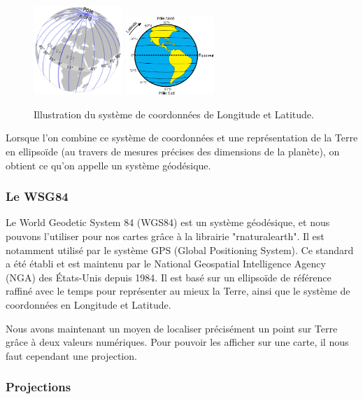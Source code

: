 \documentclass{article}
\begin{document}
\begin{figure}[htp]
    \centering
    \includegraphics[width=0.3\textwidth]{Images/Cartographie/Longitude.png}
    \includegraphics[width=0.3\textwidth]{Images/Cartographie/Latitude.png}
    \caption{Illustration du système de coordonnées de Longitude et Latitude.}
    \label{fig:longitude_et_latitude}
\end{figure}

Lorsque l'on combine ce système de coordonnées et une représentation de la Terre en ellipsoïde (au travers de mesures précises des dimensions de la planète), on obtient ce qu'on appelle un système géodésique.

\subsubsection{Le WSG84}

Le World Geodetic System 84 (WGS84) \cite{wgs84} est un système géodésique, et nous pouvons l'utiliser pour nos cartes grâce à la librairie "rnaturalearth". Il est notamment utilisé par le système GPS (Global Positioning System). Ce standard a été établi et est maintenu par le National Geospatial Intelligence Agency (NGA) des États-Unis \cite{enwiki:1065796786} depuis 1984. Il est basé sur un ellipsoïde de référence raffiné avec le temps pour représenter au mieux la Terre, ainsi que le système de coordonnées en Longitude et Latitude.

Nous avons maintenant un moyen de localiser précisément un point sur Terre grâce à deux valeurs numériques. Pour pouvoir les afficher sur une carte, il nous faut cependant une projection.

\subsubsection{Projections}
\end{document}
